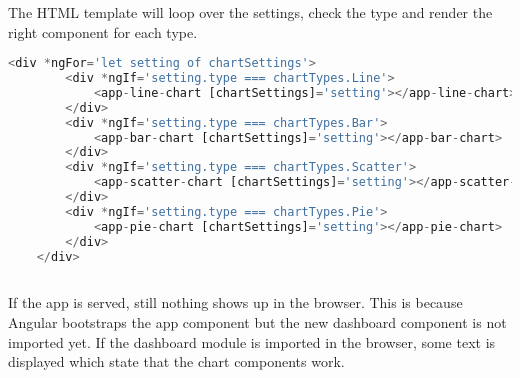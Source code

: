 The HTML template will loop over the settings, check the type and render the right component for each type.

 
\begin{lstlisting}[language=JavaScript] 	
	<div *ngFor='let setting of chartSettings'>
		<div *ngIf='setting.type === chartTypes.Line'>
			<app-line-chart [chartSettings]='setting'></app-line-chart>
		</div>
		<div *ngIf='setting.type === chartTypes.Bar'>
			<app-bar-chart [chartSettings]='setting'></app-bar-chart>
		</div>
		<div *ngIf='setting.type === chartTypes.Scatter'>
			<app-scatter-chart [chartSettings]='setting'></app-scatter-chart>
		</div>
		<div *ngIf='setting.type === chartTypes.Pie'>
			<app-pie-chart [chartSettings]='setting'></app-pie-chart>
		</div>
	</div>
	
\end{lstlisting}

If the app is served, still nothing shows up in the browser. This is because Angular bootstraps the app component but the new dashboard component is not imported yet. If the dashboard module is imported in the browser, some text is displayed which state that the chart components work.








